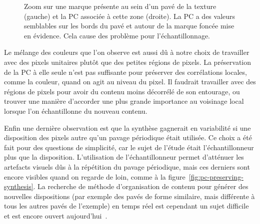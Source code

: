 \begin{figure}
    \caption[Problème d'échantillonnage dû à la présence de marques au sein des pavés de la texture]{Zoom sur une marque présente au sein d'un pavé de la texture (gauche) et la PC associée à cette zone (droite). La PC a des valeurs semblables sur les bords du pavé et autour de la marque foncée mise en évidence. Cela cause des problème pour l'échantillonnage.}
    \label{fig:pc-defect}
\end{figure}

Le mélange des couleurs que l'on observe est aussi dû à notre choix de travailler avec des pixels unitaires plutôt que des petites régions de pixels. La préservation de la PC à elle seule n'est pas suffisante pour préserver des corrélations locales, comme la couleur, quand on agit au niveau du pixel. Il faudrait travailler avec des régions de pixels pour avoir du contenu moins décorrélé de son entourage, ou trouver une manière d'accorder une plus grande importance au voisinage local lorsque l'on échantillonne du nouveau contenu.

\bigskip

Enfin une dernière observation est que la synthèse gagnerait en variabilité si une disposition des pixels autre qu'un pavage périodique était utilisée. Ce choix a été fait pour des questions de simplicité, car le sujet de l'étude était l'échantillonneur plus que la disposition. L'utilisation de l'échantillonneur permet d'atténuer les artefacts visuels dûs à la répétition du pavage périodique, mais ces derniers sont encore visibles quand on regarde de loin, comme à la figure~\ref{fig:pc-preserving-synthesis}. La recherche de méthode d'organisation de contenu pour générer des nouvelles dispositions (par exemple des pavés de forme similaire, mais différente à tous les autres pavés de l'exemple) en temps réel est cependant un sujet difficile et est encore ouvert aujourd'hui~\cite{guehl_semi-procedural_2020, baldi_differentiable_2023}.